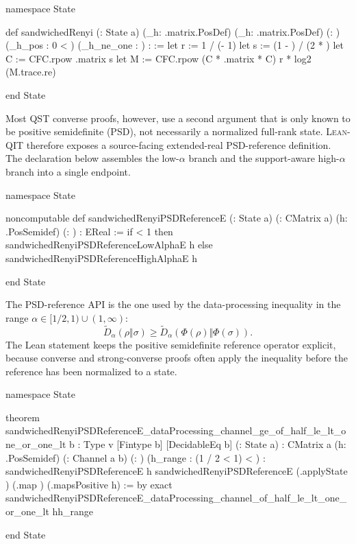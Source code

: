 \documentclass[10pt,a4paper]{article}
\DeclareRobustCommand{\LeanQIT}{\textnormal{\textsc{Lean-QIT}}}
\newif\ifqitLineFocused
\newcommand{\qitHighlightSpan}[2]{%
	\ifnum\value{lstnumber}<#1\relax
	\else
		\ifnum\value{lstnumber}>#2\relax
		\else
			\qitLineFocusedtrue
		\fi
	\fi
}
\begin{document}
\begin{qitleancode}[title={Sandwiched R\'enyi divergence}]
namespace State

def sandwichedRenyi (\rho \sigma : State a)
    (_h\rho : \rho.matrix.PosDef) (_h\sigma : \sigma.matrix.PosDef)
    (\alpha : \mathbbR) (_h\alpha_pos : 0 < \alpha)
    (_h\alpha_ne_one : \alpha {}) : \mathbbR :=
  let r := 1 / (\alpha - 1)
  let s := (1 - \alpha) / (2 * \alpha)
  let C := CFC.rpow \sigma.matrix s
  let M := CFC.rpow (C * \rho.matrix * C) \alpha
  r * log2 (M.trace.re)

end State
\end{qitleancode}
	
	Most QST converse proofs, however, use a second argument that is only known to
	be positive semidefinite (PSD), not necessarily a normalized full-rank state.
	\LeanQIT{} therefore exposes a source-facing extended-real PSD-reference
	definition.  The declaration below assembles the low-$\alpha$ branch and the
	support-aware high-$\alpha$ branch into a single endpoint.
	
\begin{qitleancode}[title={PSD-reference R\'enyi divergence}]
namespace State

noncomputable def sandwichedRenyiPSDReferenceE
    (\rho : State a) (\sigma : CMatrix a) (h\sigma : \sigma.PosSemidef)
    (\alpha : \mathbbR) : EReal :=
  if \alpha < 1 then
    sandwichedRenyiPSDReferenceLowAlphaE \rho \sigma h\sigma \alpha
  else
    sandwichedRenyiPSDReferenceHighAlphaE \rho \sigma h\sigma \alpha

end State
\end{qitleancode}
	
	The PSD-reference API is the one used by the data-processing inequality in the range $\alpha\in[1/2,1)\cup(1,\infty)$:
	\begin{equation}
		\widetilde D_\alpha(\rho\Vert\sigma)
		\ge
		\widetilde D_\alpha(\Phi(\rho)\Vert\Phi(\sigma)).
	\end{equation}
	The Lean statement keeps the positive semidefinite reference operator
	explicit, because converse and strong-converse proofs often apply the
	inequality before the reference has been normalized to a state.
	
\begin{qitleancode}[title={PSD-reference data processing},
qit focus={\qitHighlightSpan{8}{11}}]
namespace State

theorem sandwichedRenyiPSDReferenceE_dataProcessing_channel_ge_of_half_le_lt_one_or_one_lt
    {b : Type v} [Fintype b] [DecidableEq b]
    (\rho : State a) {\sigma : CMatrix a} (h\sigma : \sigma.PosSemidef)
    (\Phi : Channel a b) (\alpha : \mathbbR)
    (h\alpha_range : (1 / 2 \le \alpha \wedge \alpha < 1)  < \alpha) :
    sandwichedRenyiPSDReferenceE \rho \sigma h\sigma \alpha \ge
      sandwichedRenyiPSDReferenceE
        (\Phi.applyState \rho) (\Phi.map \sigma)
        (\Phi.mapsPositive \sigma h\sigma) \alpha := by
  exact
    sandwichedRenyiPSDReferenceE_dataProcessing_channel_of_half_le_lt_one_or_one_lt
      \rho h\sigma \Phi \alpha h\alpha_range

end State
\end{qitleancode}
	
\end{document}
